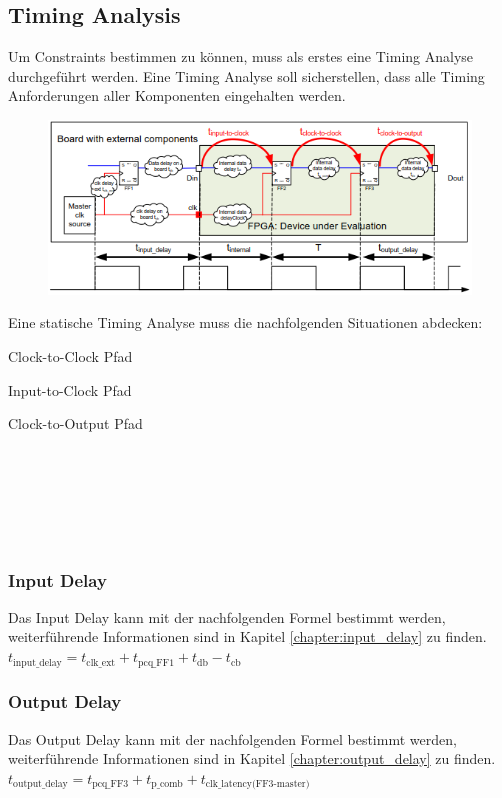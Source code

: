 \subsection{Timing Analysis}
Um Constraints bestimmen zu können, muss als erstes eine Timing Analyse durchgeführt werden. Eine Timing Analyse soll sicherstellen, dass alle Timing Anforderungen aller Komponenten eingehalten werden. \\
\begin{minipage}{0.65\textwidth}
    \begin{figure}[H]
        \includegraphics[width=\textwidth]{images/static_timing_analysis.png}
    \end{figure}
\end{minipage}
\hfill
\begin{minipage}{0.3\textwidth}
    Eine statische Timing Analyse muss die nachfolgenden Situationen abdecken:
    \begin{compactitem}
        \item Clock-to-Clock Pfad
        \item Input-to-Clock Pfad
        \item Clock-to-Output Pfad
    \end{compactitem}
    \ \\ \ \\ \ \\ \ \\ \ \\
\end{minipage}
\hspace*{+1cm}
\begin{multicols}{2}
    \subsubsection{Input Delay}
    Das Input Delay kann mit der nachfolgenden Formel bestimmt werden, weiterführende Informationen sind in Kapitel \ref{chapter:input_delay} zu finden. \\
    $t_{\text{input\_delay}}=t_{\text{clk\_ext}}+t_{\text{pcq\_FF1}}+t_{\text{db}}-t_{\text{cb}}$

    \subsubsection{Output Delay}
    Das Output Delay kann mit der nachfolgenden Formel bestimmt werden, weiterführende Informationen sind in Kapitel \ref{chapter:output_delay} zu finden. \\
    $t_{\text{output\_delay}}=t_{\text{pcq\_FF3}}+t_{\text{p\_comb}}+t_{\text{clk\_latency(FF3-master)}}$
\end{multicols}

